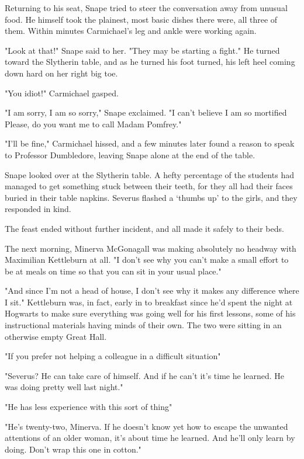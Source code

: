 Returning to his seat, Snape tried to steer the conversation away from unusual food. He himself took the plainest, most basic dishes there were, all three of them. Within minutes Carmichael's leg and ankle were working again.

"Look at that!" Snape said to her. "They may be starting a fight." He turned toward the Slytherin table, and as he turned his foot turned, his left heel coming down hard on her right big toe.

"You idiot!" Carmichael gasped.

"I am sorry, I am so sorry," Snape exclaimed. "I can't believe{\el} I am so mortified{\el} Please, do you want me to call Madam Pomfrey."

"I'll be fine," Carmichael hissed, and a few minutes later found a reason to speak to Professor Dumbledore, leaving Snape alone at the end of the table.

Snape looked over at the Slytherin table. A hefty percentage of the students had managed to get something stuck between their teeth, for they all had their faces buried in their table napkins. Severus flashed a `thumbs up' to the girls, and they responded in kind.

The feast ended without further incident, and all made it safely to their beds.

The next morning, Minerva McGonagall was making absolutely no headway with Maximilian Kettleburn at all. "I don't see why you can't make a small effort to be at meals on time so that you can sit in your usual place."

"And since I'm not a head of house, I don't see why it makes any difference where I sit." Kettleburn was, in fact, early in to breakfast since he'd spent the night at Hogwarts to make sure everything was going well for his first lessons, some of his instructional materials having minds of their own. The two were sitting in an otherwise empty Great Hall.

"If you prefer not helping a colleague in a difficult situation{\el}"

"Severus? He can take care of himself. And if he can't it's time he learned. He was doing pretty well last night."

"He has less experience with this sort of thing{\el}"

"He's twenty-two, Minerva. If he doesn't know yet how to escape the unwanted attentions of an older woman, it's about time he learned. And he'll only learn by doing. Don't wrap this one in cotton."

